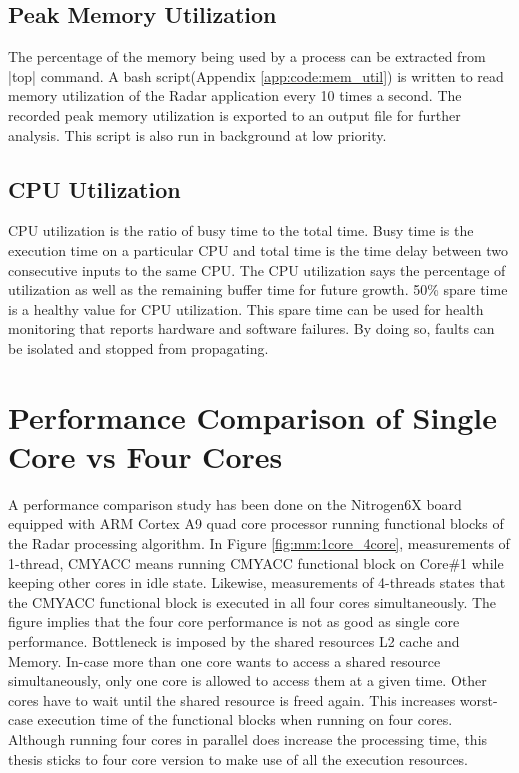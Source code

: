 \subsection{Peak Memory Utilization}
\label{ss:mm:mem_util}
The percentage of the memory being used by a process can be extracted from \bverb|top| command. A bash script(Appendix \ref{app:code:mem_util}) is written to read memory utilization of the Radar application every 10 times a second. The recorded peak memory utilization is exported to an output file for further analysis. This script is also run in background at low priority.

\subsection{CPU Utilization}
\label{ss:mm:cpu_load}
CPU utilization is the ratio of busy time to the total time. Busy time is the execution time on a particular CPU and total time is the time delay between two consecutive inputs to the same CPU. The CPU utilization says the percentage of utilization as well as the remaining buffer time for future growth. 50\% spare time is a healthy value for CPU utilization. This spare time can be used for health monitoring that reports hardware and software failures. By doing so, faults can be isolated and stopped from propagating.

\section{Performance Comparison of Single Core vs Four Cores}
\label{sec:mm:perf_comp}
A performance comparison study has been done on the Nitrogen6X board equipped with ARM Cortex A9 quad core processor running functional blocks of the Radar processing algorithm. In Figure \ref{fig:mm:1core_4core}, measurements of 1-thread, CMYACC means running CMYACC functional block on Core\#1 while keeping other cores in idle state. Likewise, measurements of 4-threads states that the CMYACC functional block is executed in all four cores simultaneously. The figure implies that the four core performance is not as good as single core performance. Bottleneck is imposed by the shared resources L2 cache and Memory. In-case more than one core wants to access a shared resource simultaneously, only one core is allowed to access them at a given time. Other cores have to wait until the shared resource is freed again. This increases worst-case execution time of the functional blocks when running on four cores. Although running four cores in parallel does increase the processing time, this thesis sticks to four core version to make use of all the execution resources.

